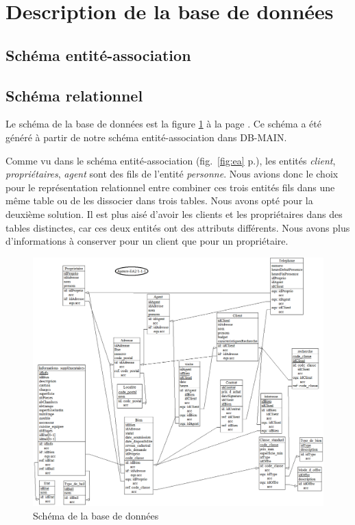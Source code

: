 \section{Description de la base de données}
\subsection{Schéma entité-association}

\subsection{Schéma relationnel}
Le schéma de la base de données est la figure \ref{fig:bdd} à la page \pageref{fig:bdd}.
Ce schéma a été généré à partir de notre schéma entité-association dans DB-MAIN.

Comme vu dans le schéma entité-association (fig.~\ref{fig:ea} p.\pageref{fig:ea}), les entités \textit{client}, \textit{propriétaires}, \textit{agent} sont des fils de l'entité \textit{personne}. Nous avions donc le choix pour le représentation relationnel entre combiner ces trois entités fils dans une même table ou de les dissocier dans trois tables. Nous avons opté pour la deuxième solution. Il est plus aisé d'avoir les clients et les propriétaires dans des tables distinctes, car ces deux entités ont des attributs différents. Nous avons plus d'informations à conserver pour un client que pour un propriétaire.

\begin{figure}[H]
	\centering
	\includegraphics[width=16cm]{relationnel.png}
	\caption{Schéma de la base de données}
	\label{fig:bdd}
\end{figure}


